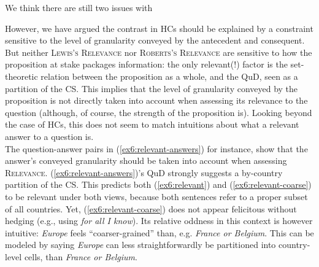 We think there are still two issues with 


  However, we have argued the contrast in HCs should be explained by a constraint sensitive to the level of granularity conveyed by the antecedent and consequent. But neither \textsc{Lewis's Relevance} nor \textsc{Roberts's Relevance} are sensitive to how the proposition at stake packages information: the only relevant(!) factor is the set-theoretic relation between the proposition as a whole, and the QuD, seen as a partition of the CS. This implies that the level of granularity conveyed by the proposition is not directly taken into account when assessing its relevance to the question (although, of course, the strength of the proposition is). Looking beyond the case of HCs, this does not seem to match intuitions about what a relevant answer to a question is.\\

The question-answer pairs in (\ref{ex6:relevant-answers}) for instance, show that the answer's conveyed granularity should be taken into account when assessing \textsc{Relevance}. (\ref{ex6:relevant-answers})'s QuD strongly suggests a by-country partition of the CS. This predicts both (\ref{ex6:relevant}) and (\ref{ex6:relevant-coarse}) to be relevant under both views, because both sentences refer to a proper subset of all countries. Yet, (\ref{ex6:relevant-coarse}) does not appear felicitous without hedging (e.g., using \textit{for all I know}). Its relative oddness in this context is however intuitive: \textit{Europe} feels ``coarser-grained'' than, e.g. \textit{France or Belgium}. This can be modeled by saying \textit{Europe} can less straightforwardly be partitioned into country-level cells, than \textit{France or Belgium}. 

\begin{exe}
	\begin{xlist}
		\label{ex6:relevant}
		\label{ex6:relevant-coarse}
		\label{ex6:overinformative}
		\label{ex6:irrelevant}
	\end{xlist}
	\label{ex6:relevant-answers}
\end{exe}

